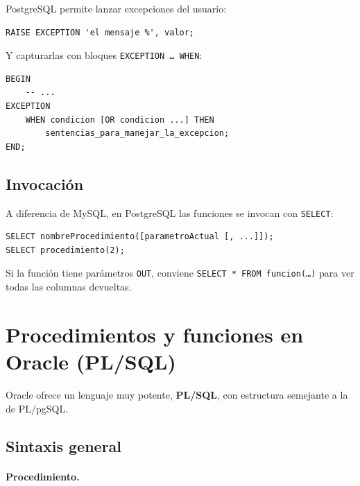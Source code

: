 \documentclass[11pt,a4paper]{article}
\begin{document}
PostgreSQL permite lanzar excepciones del usuario:

\begin{lstlisting}
RAISE EXCEPTION 'el mensaje %', valor;
\end{lstlisting}

Y capturarlas con bloques \texttt{EXCEPTION \dots\ WHEN}:

\begin{lstlisting}
BEGIN
    -- ...
EXCEPTION
    WHEN condicion [OR condicion ...] THEN
        sentencias_para_manejar_la_excepcion;
END;
\end{lstlisting}

\subsection{Invocación}

A diferencia de MySQL, en PostgreSQL las funciones se invocan con
\texttt{SELECT}:

\begin{lstlisting}
SELECT nombreProcedimiento([parametroActual [, ...]]);
SELECT procedimiento(2);
\end{lstlisting}

Si la función tiene parámetros \texttt{OUT}, conviene
\texttt{SELECT * FROM funcion(\dots)} para ver todas las columnas
devueltas.

\section{Procedimientos y funciones en Oracle (PL/SQL)}

Oracle ofrece un lenguaje muy potente, \textbf{PL/SQL}, con
estructura semejante a la de PL/pgSQL.

\subsection{Sintaxis general}

\paragraph{Procedimiento.}
\end{document}
